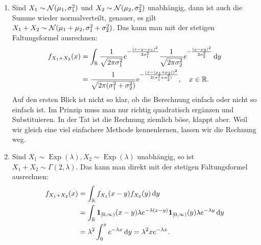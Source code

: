 \begin{beispiel}\label{B5}  \abs

	\begin{enumerate}[label=(\roman*)]\label{bspFaltung}
		\item Sind $X_1 \sim \mathcal{N}(\mu_1,\sigma_1^2)$ und $X_2 \sim \mathcal{N}(\mu_2,\sigma_2^2)$ unabhängig, dann ist auch die Summe wieder normalverteilt, genauer, es gilt $X_1 + X_2 \sim \mathcal{N}(\mu_1 + \mu_2, \sigma_1^2 + \sigma_2^2)$. Das kann man mit der stetigen Faltungsformel ausrechnen:
		\begin{align*}
			f_{X_1 + X_2}(x) &= \int_{\mathbb{R}} \frac{1}{\sqrt{2 \pi \sigma_1^2}} e^{-\frac{(x-y-\mu_1)^2}{2\sigma_1^2}} \frac{1}{\sqrt{2 \pi \sigma_2^2}} e^{-\frac{(y-\mu_2)^2}{2\sigma_2^2}} \, \mathrm{d} y\\
			&=\frac{1}{\sqrt{2\pi(\sigma_1^2+\sigma_2^2)}} e^{-\frac{(x-(\mu_1+\mu_2))^2}{2(\sigma_1^2+\sigma_2^2)}},\quad x\in\mathbb{R}.
		\end{align*}
		Auf den ersten Blick ist nicht so klar, ob die Berechnung einfach oder nicht so einfach ist. Im Prinzip muss man nur richtig quadratisch erg\"anzen und Substituieren. In der Tat ist die Rechnung ziemlich b\"ose, klappt aber. Weil wir gleich eine viel einfachere Methode kennenlernen, lassen wir die Rechnung weg.
		\item Sind $X_1 \sim \operatorname{Exp}(\lambda), X_2 \sim \operatorname{Exp}(\lambda)$ unabhängig, so ist $X_1+ X_2 \sim \Gamma(2,\lambda)$. Das kann man direkt mit der stetigen Faltungsformel ausrechnen:
		\begin{align*}
			f_{X_1+X_2}(x)&=\int_{\mathbb{R}}  f_{X_1}(x-y) f_{X_2}(y)\, \mathrm{d} y\\
			 &=\int_{\mathbb{R}} \mathbf 1_{[0,\infty)}(x-y) \lambda e^{-\lambda (x-y)} \mathbf 1_{[0,\infty)}(y) \lambda e^{-\lambda y}\, \mathrm{d} y\\
			&=\lambda^2 \int_0^x e^{-\lambda x} \, \mathrm{d} y=\lambda^2 x e^{-\lambda x}.
		\end{align*}
\end{enumerate}
\end{beispiel}

